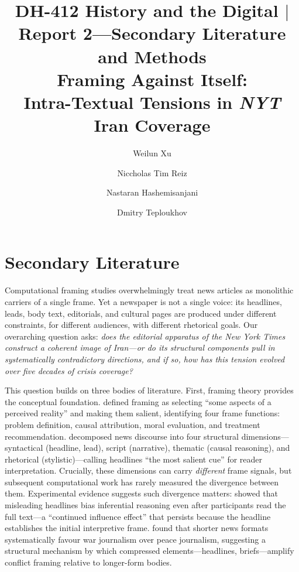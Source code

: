 \documentclass{dhnbpub}
\begin{document}

\title{{\normalsize DH-412 History and the Digital $|$ Report 2---Secondary Literature and Methods}\\[0.3em]
Framing Against Itself: \\Intra-Textual Tensions in \textit{NYT} Iran Coverage}

\author{Weilun Xu}
\author{Niccholas Tim Reiz}
\author{Nastaran Hashemisanjani}
\author{Dmitry Teploukhov}

\maketitle

\section{Secondary Literature}

Computational framing studies overwhelmingly treat news articles as monolithic carriers of a single frame. Yet a newspaper is not a single voice: its headlines, leads, body text, editorials, and cultural pages are produced under different constraints, for different audiences, with different rhetorical goals. Our overarching question asks: \emph{does the editorial apparatus of the \textit{New York Times} construct a coherent image of Iran---or do its structural components pull in systematically contradictory directions, and if so, how has this tension evolved over five decades of crisis coverage?}

This question builds on three bodies of literature. First, framing theory provides the conceptual foundation. \citet{Entman1993} defined framing as selecting ``some aspects of a perceived reality'' and making them salient, identifying four frame functions: problem definition, causal attribution, moral evaluation, and treatment recommendation. \citet{PanKosicki1993} decomposed news discourse into four structural dimensions---syntactical (headline, lead), script (narrative), thematic (causal reasoning), and rhetorical (stylistic)---calling headlines ``the most salient cue'' for reader interpretation. Crucially, these dimensions can carry \emph{different} frame signals, but subsequent computational work has rarely measured the divergence between them. Experimental evidence suggests such divergence matters: \citet{Ecker2014} showed that misleading headlines bias inferential reasoning even after participants read the full text---a ``continued influence effect'' that persists because the headline establishes the initial interpretive frame. \citet{LeeMaslog2005} found that shorter news formats systematically favour war journalism over peace journalism, suggesting a structural mechanism by which compressed elements---headlines, briefs---amplify conflict framing relative to longer-form bodies.
\end{document}
